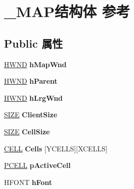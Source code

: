 \hypertarget{struct___m_a_p}{}\section{\+\_\+\+M\+A\+P结构体 参考}
\label{struct___m_a_p}
\subsection*{Public 属性}
\begin{DoxyCompactItemize}
\item 
\mbox{\label{struct___m_a_p_a3f3c26f61e6b56f9e78f431c9beebbb0}} 
\hyperlink{interfacevoid}{H\+W\+ND} {\bfseries h\+Map\+Wnd}
\item 
\mbox{\label{struct___m_a_p_a78c808b26bfca5af6a0984acfe7a11a1}} 
\hyperlink{interfacevoid}{H\+W\+ND} {\bfseries h\+Parent}
\item 
\mbox{\label{struct___m_a_p_a0e7734a2e0c534bc503a7b9256563326}} 
\hyperlink{interfacevoid}{H\+W\+ND} {\bfseries h\+Lrg\+Wnd}
\item 
\mbox{\label{struct___m_a_p_a27e29420ed47924c5b07977e9512932a}} 
\hyperlink{structtag_s_i_z_e}{S\+I\+ZE} {\bfseries Client\+Size}
\item 
\mbox{\label{struct___m_a_p_aab9fce9bbb257cfeb5ccace10c4c24ed}} 
\hyperlink{structtag_s_i_z_e}{S\+I\+ZE} {\bfseries Cell\+Size}
\item 
\mbox{\label{struct___m_a_p_a3c86c2b39d1b357b027366f450553219}} 
\hyperlink{struct___c_e_l_l}{C\+E\+LL} {\bfseries Cells} \mbox{[}Y\+C\+E\+L\+LS\mbox{]}\mbox{[}X\+C\+E\+L\+LS\mbox{]}
\item 
\mbox{\label{struct___m_a_p_afd5768742430fe239441f2ff014ec787}} 
\hyperlink{struct___c_e_l_l}{P\+C\+E\+LL} {\bfseries p\+Active\+Cell}
\item 
\mbox{\label{struct___m_a_p_a41adef4a3d5c6282fc75c119acb3e522}} 
H\+F\+O\+NT {\bfseries h\+Font}
\item 
\mbox{\label{struct___m_a_p_abf66725072a13aaf037928fd44fa237c}} 

\end{DoxyCompactItemize}
